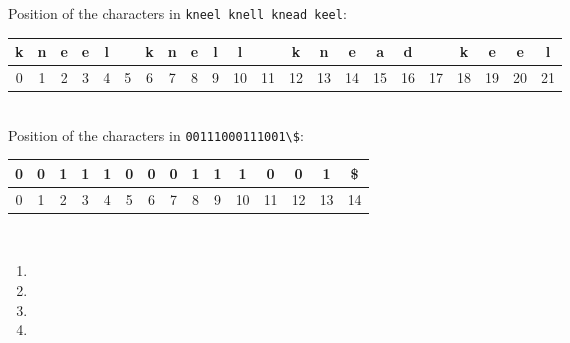 \documentclass[12pt]{article}
\begin{document}
Position of the characters in \verb+kneel knell knead keel+:\\
\begin{tabular}{|c|c|c|c|c|c|c|c|c|c|c|c|c|c|c|c|c|c|c|c|c|c|}
\hline
k & n & e & e & l & & k & n & e & l & l & & k & n & e & a & d & & k & e & e & l\\\hline
0 & 1 & 2 & 3 & 4 & 5 & 6 & 7 & 8 & 9 & 10 & 11 & 12 & 13 & 14 & 15 & 16 & 17 & 18 & 19 & 20 & 21\\
\end{tabular}\\

Position of the characters in \verb+00111000111001\$+:\\
\begin{tabular}{|c|c|c|c|c|c|c|c|c|c|c|c|c|c|c|}
0 & 0 & 1 & 1 & 1 & 0 & 0 & 0 & 1 & 1 & 1 & 0 & 0 & 1 & \$\\\hline
0 & 1 & 2 & 3 & 4 & 5 & 6 & 7 & 8 & 9 & 10 & 11 & 12 & 13 & 14\\\hline
\end{tabular}\\

\begin{enumerate}
\item  \done
\item  \done
\item  \done
\item  \done
\end{enumerate}
\end{document}
